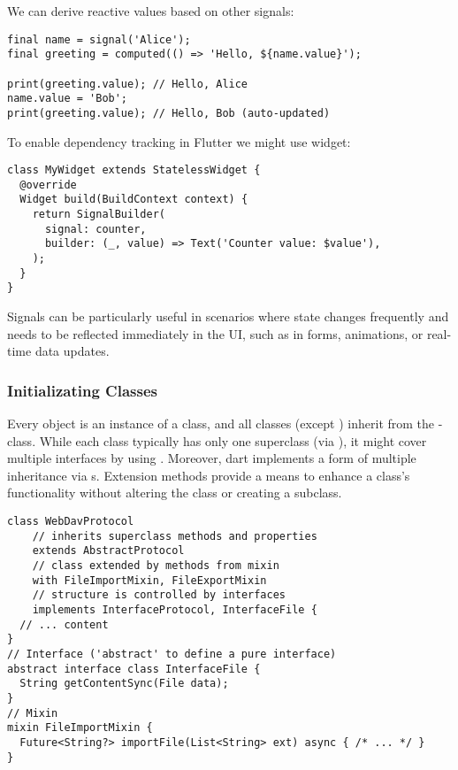 \noindent We can derive reactive values based on other signals:

\begin{lstlisting}
final name = signal('Alice');
final greeting = computed(() => 'Hello, ${name.value}');

print(greeting.value); // Hello, Alice
name.value = 'Bob';
print(greeting.value); // Hello, Bob (auto-updated)
\end{lstlisting}

\noindent To enable dependency tracking in Flutter we might use  widget:

\begin{lstlisting}
class MyWidget extends StatelessWidget {
  @override
  Widget build(BuildContext context) {
    return SignalBuilder(
      signal: counter,
      builder: (_, value) => Text('Counter value: $value'),
    );
  }
}
\end{lstlisting}

\noindent Signals can be particularly useful in scenarios where state changes frequently and needs to be reflected
immediately in the UI, such as in forms, animations, or real-time data updates.


\subsubsection{Initializating Classes}

Every object is an instance of a class, and all classes (except ) inherit from the -class. While each
class typically has only one superclass (via ), it might cover multiple interfaces by using .
Moreover, dart implements a form of multiple inheritance via s. Extension methods provide a means to
enhance a class's functionality without altering the class or creating a subclass.

\begin{lstlisting}
class WebDavProtocol
    // inherits superclass methods and properties
    extends AbstractProtocol
    // class extended by methods from mixin
    with FileImportMixin, FileExportMixin
    // structure is controlled by interfaces
    implements InterfaceProtocol, InterfaceFile {
  // ... content
}
// Interface ('abstract' to define a pure interface)
abstract interface class InterfaceFile {
  String getContentSync(File data);
}
// Mixin
mixin FileImportMixin {
  Future<String?> importFile(List<String> ext) async { /* ... */ }
}
\end{lstlisting}

